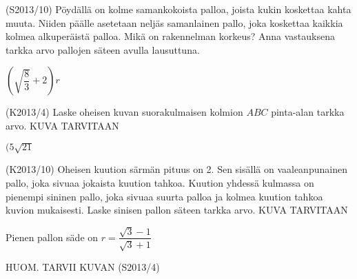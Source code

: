 \begin{tehtava} 
(S2013/10) Pöydällä on kolme samankokoista palloa, joista kukin koskettaa kahta muuta. Niiden päälle asetetaan neljäs samanlainen pallo, joka koskettaa kaikkia kolmea alkuperäistä palloa. Mikä on rakennelman korkeus? Anna vastauksena tarkka arvo pallojen säteen avulla lausuttuna.
  \begin{vastaus}
  $\left(\sqrt{\dfrac83}+2\right)r$
  \end{vastaus}
\end{tehtava}

\begin{tehtava} 
(K2013/4) Laske oheisen kuvan suorakulmaisen kolmion $ABC$ pinta-alan tarkka arvo.
KUVA TARVITAAN
  \begin{vastaus}
  $(5\sqrt{21}$
  \end{vastaus}
\end{tehtava}

\begin{tehtava} 
(K2013/10) Oheisen kuution särmän pituus on 2. Sen sisällä on vaaleanpunainen pallo, joka sivuaa jokaista kuution tahkoa. Kuution yhdessä kulmassa on pienempi sininen pallo, joka sivuaa suurta palloa ja kolmea kuution tahkoa kuvion mukaisesti. Laske sinisen pallon säteen tarkka arvo.
KUVA TARVITAAN
  \begin{vastaus}
  Pienen pallon säde on $r=\dfrac{\sqrt{3}-1}{\sqrt{3}+1}$
  \end{vastaus}
\end{tehtava}

\begin{tehtava} 
HUOM. TARVII KUVAN 
(S2013/4) 
  \begin{alakohdat}

  \end{alakohdat}
				\begin{vastaus}
				\begin{alakohdat}
				\end{alakohdat}
				\end{vastaus}
\end{tehtava}

